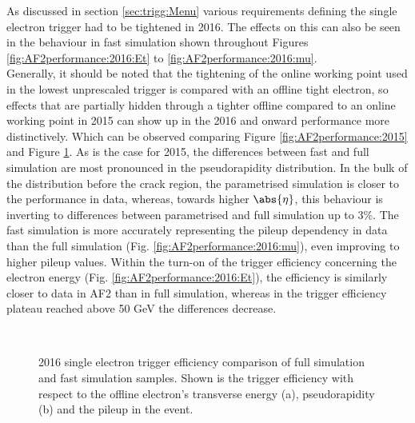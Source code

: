 As discussed in section \ref{sec:trigg:Menu} various requirements defining the single electron trigger had to be tightened in 2016.  The effects on this can also be seen in the behaviour in fast simulation shown throughout Figures \ref{fig:AF2performance:2016:Et} to \ref{fig:AF2performance:2016:mu}.  \\
Generally,  it should be noted that the tightening of the online working point used in the lowest unprescaled trigger is compared with an offline tight electron,  so effects that are partially hidden through a tighter offline compared to an online working point in 2015 can show up in the 2016 and onward performance more distinctively.  Which can be observed comparing Figure \ref{fig:AF2performance:2015} and Figure \ref{fig:AF2performance:2016}.
As is the case for 2015, the differences between fast and full simulation are most pronounced in the pseudorapidity distribution.  In the bulk of the distribution before the crack region,  the parametrised simulation is closer to the performance in data, whereas, towards higher $\abs{\eta}$,  this behaviour is inverting to differences between parametrised and full simulation up to 3\%.
The fast simulation is more accurately representing the pileup dependency in data than the full simulation (Fig.  \ref{fig:AF2performance:2016:mu}), even improving to higher pileup values.  Within the turn-on of the trigger efficiency concerning the electron energy (Fig.  \ref{fig:AF2performance:2016:Et}), the efficiency is similarly closer to data in AF2 than in full simulation, whereas in the trigger efficiency plateau reached above 50 GeV the differences decrease. 


\begin{figure}[h]\centering
  \\
  \caption{2016 single electron trigger efficiency comparison of full simulation and fast simulation samples. Shown is the trigger efficiency with respect to the offline electron's transverse energy (a),  pseudorapidity (b) and the pileup in the event. \label{fig:AF2performance:2016}}
\end{figure}

